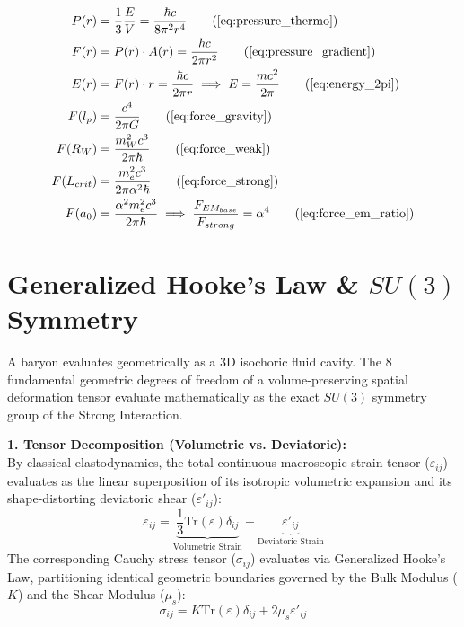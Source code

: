 \documentclass[11pt, a4paper]{article}
\begin{document}
\begin{tcolorbox}[recallbox, title={\ref{box:pressure_gradient}. Continuous Pressure Dynamics}]
\begin{align}
    P(r) &= \frac{1}{3} \frac{E}{V} = \frac{\hbar c}{8\pi^2 r^4} \tag{\ref{eq:pressure_thermo}} \\
    F(r) &= P(r) \cdot A(r) = \frac{\hbar c}{2\pi r^2} \tag{\ref{eq:pressure_gradient}} \\
    E(r) &= F(r) \cdot r = \frac{\hbar c}{2\pi r} \implies E = \frac{mc^2}{2\pi} \tag{\ref{eq:energy_2pi}} \\
    F(l_p) &= \frac{c^4}{2\pi G} \tag{\ref{eq:force_gravity}} \\
    F(R_W) &= \frac{m_W^2 c^3}{2\pi \hbar} \tag{\ref{eq:force_weak}} \\
    F(L_{crit}) &= \frac{m_e^2 c^3}{2\pi \alpha^2 \hbar} \tag{\ref{eq:force_strong}} \\
    F(a_0) &= \frac{\alpha^2 m_e^2 c^3}{2\pi \hbar} \implies \frac{F_{EM_{base}}}{F_{strong}} = \alpha^4 \tag{\ref{eq:force_em_ratio}}
\end{align}
\end{tcolorbox}

\section{Generalized Hooke's Law \& $SU(3)$ Symmetry}
\label{sec:deriv_hookes_su3}

A baryon evaluates geometrically as a 3D isochoric fluid cavity. The 8 fundamental geometric degrees of freedom of a volume-preserving spatial deformation tensor evaluate mathematically as the exact $SU(3)$ symmetry group of the Strong Interaction.

\textbf{1. Tensor Decomposition (Volumetric vs. Deviatoric):} \\
By classical elastodynamics, the total continuous macroscopic strain tensor ($\varepsilon_{ij}$) evaluates as the linear superposition of its isotropic volumetric expansion and its shape-distorting deviatoric shear ($\varepsilon'_{ij}$):
\begin{equation}
    \varepsilon_{ij} = \underbrace{\frac{1}{3}\text{Tr}(\varepsilon)\delta_{ij}}_{\text{Volumetric Strain}} + \underbrace{\varepsilon'_{ij}}_{\text{Deviatoric Strain}} 
\end{equation}
The corresponding Cauchy stress tensor ($\sigma_{ij}$) evaluates via Generalized Hooke's Law, partitioning identical geometric boundaries governed by the Bulk Modulus ($K$) and the Shear Modulus ($\mu_s$):
\begin{equation}
    \sigma_{ij} = K \text{Tr}(\varepsilon)\delta_{ij} + 2\mu_s \varepsilon'_{ij} 
\end{equation}
\end{document}
